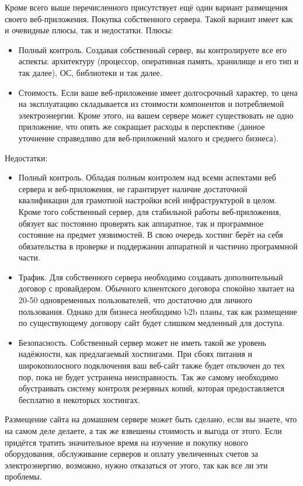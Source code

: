 Кроме всего выше перечисленного присутствует ещё один вариант размещения своего веб-приложения. Покупка собственного сервера. Такой вариант имеет как и очевидные плюсы, так и недостатки. Плюсы:

\begin{itemize}[•]
	\item 	Полный контроль. Создавая собственный сервер, вы контролируете все его аспекты: архитектуру (процессор, оперативная память, хранилище и его тип и так далее), ОС, библиотеки и так далее.
	\item Стоимость. Если ваше веб-приложение имеет долгосрочный характер, то цена на эксплуатацию складывается из стоимости компонентов и потребляемой электроэнергии. Кроме этого, на вашем сервере может существовать не одно приложение, что опять же сокращает расходы в перспективе (данное уточнение справедливо для веб-приложений малого и среднего бизнеса).
\end{itemize}

Недостатки:

\begin{itemize}[•]
	\item Полный контроль. Обладая полным контролем над всеми аспектами веб сервера и веб-приложения, не гарантирует наличие достаточной квалификации для грамотной настройки всей инфраструктурой в целом. Кроме того собственный сервер, для стабильной работы веб-приложения, обязует вас постоянно проверять как аппаратное, так и программное состояние на предмет уязвимостей. В свою очередь хостинг берёт на себя обязательства в проверке и поддержании аппаратной и частично программной части.
	\item Трафик. Для собственного сервера необходимо создавать дополнительный договор с провайдером. Обычного клиентского договора спокойно хватает на 20-50 одновременных пользователей, что достаточно для личного пользования. Однако для бизнеса необходимо b2b планы, так как размещение по существующему договору сайт будет слишком медленный для доступа.
	\item Безопасность. Собственный сервер может не иметь такой же уровень надёжности, как предлагаемый хостингами. При сбоях питания и широкополосного подключения ваш веб-сайт также будет отключен до тех пор, пока не будет устранена неисправность. Так же самому необходимо обустраивать систему контроля резервных копий, которая предоставляется бесплатно в некоторых хостингах.
\end{itemize}

Размещение сайта на домашнем сервере может быть сделано, если вы знаете, что на самом деле делаете, а так же взвешены стоимость и выгода от этого. Если придётся тратить значительное время на изучение и покупку нового оборудования, обслуживание серверов и оплату увеличенных счетов за электроэнергию, возможно, нужно отказаться от этого, так как все ли эти проблемы. 

